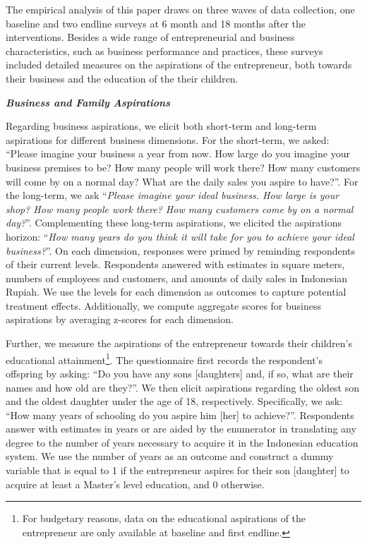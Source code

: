 \documentclass[11.5pt]{article}
\begin{document}
The empirical analysis of this paper draws on three waves of data collection, one baseline and two endline surveys at 6 month and 18 months after the interventions. Besides a wide range of entrepreneurial and business characteristics, such as business performance and practices, these surveys included detailed measures on the aspirations of the entrepreneur, both towards their business and the education of the their children. 

\textbf{\emph{Business and Family Aspirations}}

Regarding business aspirations, we elicit both short-term and long-term aspirations for different business dimensions. For the short-term, we asked: ``Please imagine your business a year from now. How large do you imagine your business premises to be? How many people will work there? How many customers will come by on a normal day? What are the daily sales you aspire to have?''. For the long-term, we ask ``\emph{Please imagine your ideal business. How large is your shop? How many people work there? How many customers come by on a normal day?}''. Complementing these long-term aspirations, we elicited the aspirations horizon: ``\emph{How many years do you think it will take for you to achieve your ideal business?}''. On each dimension, responses were primed by reminding respondents of their current levels. Respondents answered with estimates in square meters, numbers of employees and customers, and amounts of daily sales in Indonesian Rupiah. We use the levels for each dimension as outcomes to capture potential treatment effects. Additionally, we compute aggregate scores for business aspirations by averaging z-scores for each dimension.

Further, we measure the aspirations of the entrepreneur towards their children's educational attainment\footnote{For budgetary reasons, data on the educational aspirations of the entrepreneur are only available at baseline and first endline.}. The questionnaire first records the respondent's offspring by asking: ``Do you have any sons [daughters] and, if so, what are their names and how old are they?''. We then elicit aspirations regarding the oldest son and the oldest daughter under the age of 18, respectively. Specifically, we ask: ``How many years of schooling do you aspire him [her] to achieve?''. Respondents answer with estimates in years or are aided by the enumerator in translating any degree to the number of years necessary to acquire it in the Indonesian education system. We use the number of years as an outcome and construct a dummy variable that is equal to 1 if the entrepreneur aspires for their son [daughter] to acquire at least a Master's level education, and 0 otherwise. \\
\end{document}
